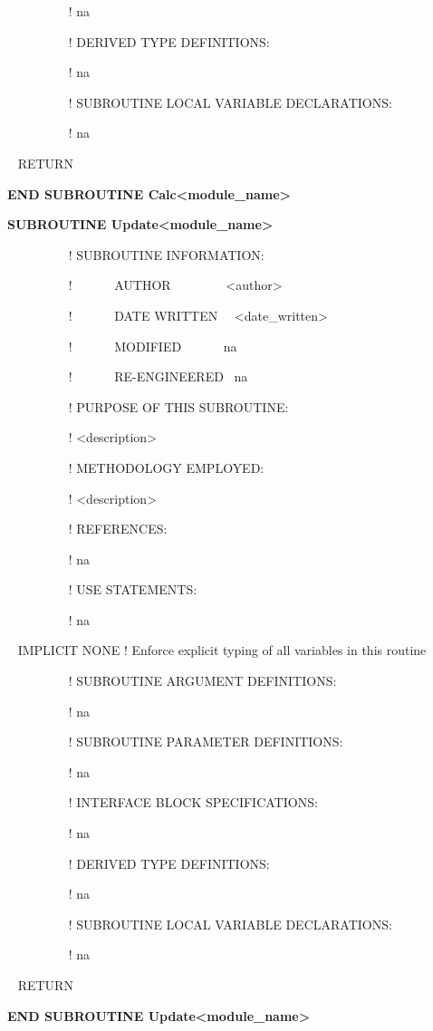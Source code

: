 ~~~~~~~~~ ! na

~~~~~~~~~ ! DERIVED TYPE DEFINITIONS:

~~~~~~~~~ ! na

~~~~~~~~~ ! SUBROUTINE LOCAL VARIABLE DECLARATIONS:

~~~~~~~~~ ! na

~ RETURN

\textbf{END SUBROUTINE Calc\textless{}module\_name\textgreater{}}

\textbf{SUBROUTINE Update\textless{}module\_name\textgreater{}}

~~~~~~~~~ ! SUBROUTINE INFORMATION:

~~~~~~~~~ !~~~~~~ AUTHOR~~~~~~~~ \textless{}author\textgreater{}

~~~~~~~~~ !~~~~~~ DATE WRITTEN~~ \textless{}date\_written\textgreater{}

~~~~~~~~~ !~~~~~~ MODIFIED~~~~~~ na

~~~~~~~~~ !~~~~~~ RE-ENGINEERED~ na

~~~~~~~~~ ! PURPOSE OF THIS SUBROUTINE:

~~~~~~~~~ ! \textless{}description\textgreater{}

~~~~~~~~~ ! METHODOLOGY EMPLOYED:

~~~~~~~~~ ! \textless{}description\textgreater{}

~~~~~~~~~ ! REFERENCES:

~~~~~~~~~ ! na

~~~~~~~~~ ! USE STATEMENTS:

~~~~~~~~~ ! na

~ IMPLICIT NONE ! Enforce explicit typing of all variables in this routine

~~~~~~~~~ ! SUBROUTINE ARGUMENT DEFINITIONS:

~~~~~~~~~ ! na

~~~~~~~~~ ! SUBROUTINE PARAMETER DEFINITIONS:

~~~~~~~~~ ! na

~~~~~~~~~ ! INTERFACE BLOCK SPECIFICATIONS:

~~~~~~~~~ ! na

~~~~~~~~~ ! DERIVED TYPE DEFINITIONS:

~~~~~~~~~ ! na

~~~~~~~~~ ! SUBROUTINE LOCAL VARIABLE DECLARATIONS:

~~~~~~~~~ ! na

~ RETURN

\textbf{END SUBROUTINE Update\textless{}module\_name\textgreater{}}

